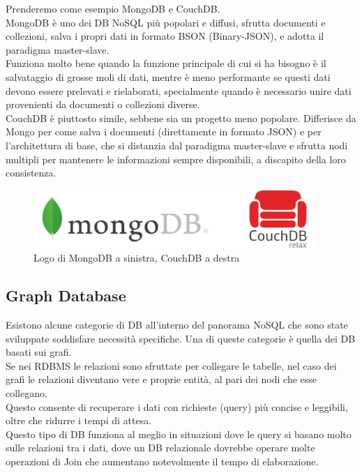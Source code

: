 \noindent Prenderemo come esempio MongoDB e CouchDB.\\
MongoDB è uno dei DB NoSQL più popolari e diffusi, sfrutta documenti e collezioni, salva i propri dati in formato BSON (Binary-JSON), e adotta il paradigma master-slave.\\
Funziona molto bene quando la funzione principale di cui si ha bisogno è il salvataggio di grosse moli di dati, mentre è meno performante se questi dati devono essere prelevati e rielaborati, specialmente quando è necessario unire dati provenienti da documenti o collezioni diverse.\\
CouchDB è piuttosto simile, sebbene sia un progetto meno popolare. Differisce da Mongo per come salva i documenti (direttamente in formato JSON) e per l'architettura di base, che si distanzia dal paradigma master-slave e sfrutta nodi multipli per mantenere le informazioni sempre disponibili, a discapito della loro consistenza.

\begin{figure}[htbp]
\begin{center}
\includegraphics[height=6em]{immagini/tecnologies-logos/MongoDB-CouchDB-Logo.png}
\caption{Logo di MongoDB a sinistra, CouchDB a destra}
\end{center}
\end{figure}

\subsection{Graph Database}
Esistono alcune categorie di DB all'interno del panorama NoSQL che sono state sviluppate soddisfare necessità specifiche. Una di queste categorie è quella dei DB basati sui grafi.\\
Se nei RDBMS le relazioni sono sfruttate per collegare le tabelle, nel caso dei grafi le relazioni diventano vere e proprie entità, al pari dei nodi che esse collegano.\\
Questo consente di recuperare i dati con richieste (query) più concise e leggibili, oltre che ridurre i tempi di attesa.\\
Questo tipo di DB funziona al meglio in situazioni dove le query si basano molto sulle relazioni tra i dati, dove un DB relazionale dovrebbe operare molte operazioni di Join che aumentano notevolmente il tempo di elaborazione.\\

